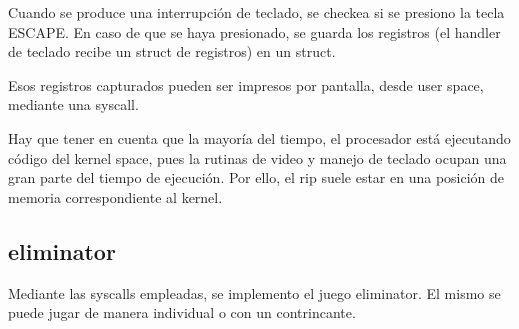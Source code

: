 \documentclass{article}
\begin{document}
Cuando se produce una interrupción de teclado, se checkea si se presiono la tecla ESCAPE. En caso de que se haya presionado, se guarda los registros (el handler de teclado recibe un struct de registros) en un struct.

Esos registros capturados pueden ser impresos por pantalla, desde user space, mediante una syscall.

Hay que tener en cuenta que la mayoría del tiempo, el procesador está ejecutando código del kernel space, pues la rutinas de video y manejo de teclado ocupan una gran parte del tiempo de ejecución. Por ello, el rip suele estar en una posición de memoria correspondiente al kernel.

\subsection {eliminator}

Mediante las syscalls empleadas, se implemento el juego eliminator. El mismo se puede jugar de manera individual o con un contrincante.
\end{document}
